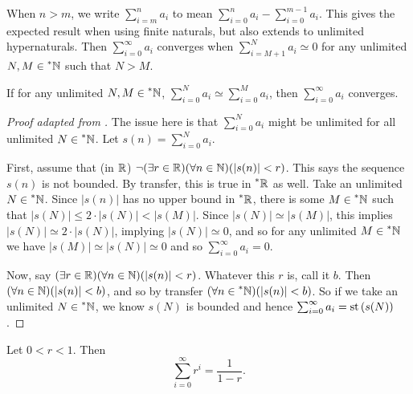 When $n > m$, we write $\sum_{i=m}^n a_i$ to mean $\sum_{i=0}^n a_i - \sum_{i=0}^{m-1} a_i$. This gives the expected result when using finite naturals, but also extends to unlimited hypernaturals. Then $\sum_{i=0}^\infty a_i$ converges when $\sum_{i=M+1}^N a_i \simeq 0$ for any unlimited $N, M \in \prescript{*}{}{\mathbb{N}}$ such that $N > M$.

\begin{thm}\label{cauchyCriterionSeries}
    If for any unlimited $N, M \in \prescript{*}{}{\mathbb{N}}$, $\sum_{i=0}^N a_i \simeq \sum_{i=0}^M a_i$, then $\sum_{i=0}^\infty a_i$ converges.
\end{thm}

\begin{proof}[Proof adapted from ]
    The issue here is that $\sum_{i=0}^N a_i$ might be unlimited for all unlimited $N \in \prescript{*}{}{\mathbb{N}}$. Let $s(n) = \sum_{i=0}^N a_i$. 
    
    First, assume that (in $\mathbb{R}$) $\neg (\exists r \in \mathbb{R}) (\forall n \in \mathbb{N})(|s(n)| < r)$. This says the sequence $s(n)$ is not bounded. By transfer, this is true in $\prescript{*}{}{\mathbb{R}}$ as well. Take an unlimited $N \in \prescript{*}{}{\mathbb{N}}$. Since $|s(n)|$ has no upper bound in $\prescript{*}{}{\mathbb{R}}$, there is some $M \in \prescript{*}{}{\mathbb{N}}$ such that $|s(N)| \leq 2 \cdot |s(N)| < |s(M)|$. Since $|s(N)| \simeq |s(M)|$, this implies $|s(N)| \simeq 2 \cdot |s(N)|$, implying $|s(N)| \simeq 0$, and so for any unlimited $M \in \prescript{*}{}{\mathbb{N}}$ we have $|s(M)| \simeq |s(N)| \simeq 0$ and so $\sum_{i=0}^\infty a_i = 0$.

    Now, say $(\exists r \in \mathbb{R}) (\forall n \in \mathbb{N})(|s(n)| < r)$. Whatever this $r$ is, call it $b$. Then $(\forall n \in \mathbb{N})(|s(n)| < b)$, and so by transfer $(\forall n \in \prescript{*}{}{\mathbb{N}})(|s(n)| < b)$. So if we take an unlimited $N \in \prescript{*}{}{\mathbb{N}}$, we know $s(N)$ is bounded and hence $\sum_{i=0}^\infty a_i = \operatorname{st}\left(s(N)\right)$.
\end{proof}

\begin{thm}\label{GeometricSeries}
    Let $0 < r < 1$. Then 
    \[ \sum_{i = 0}^\infty r^i = \frac{1}{1-r}. \]
\end{thm}


